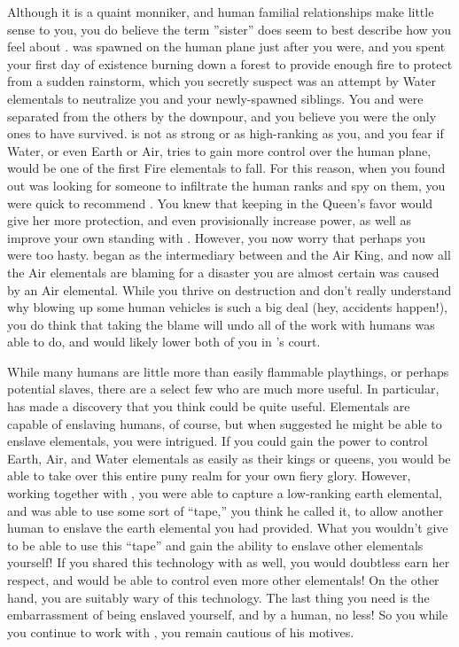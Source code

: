 \documentclass[char]{elementals}
\begin{document}
Although it is a quaint monniker, and human familial relationships make little sense to you, you do believe the term ''sister'' does seem to best describe how you feel about \cJuliet{}.  \cJuliet{\they} was spawned on the human plane just after you were, and you spent your first day of existence burning down a forest to provide enough fire to protect \cJuliet{\them} from a sudden rainstorm, which you secretly suspect was an attempt by Water elementals to neutralize you and your newly-spawned siblings.  You and \cJuliet{} were separated from the others by the downpour, and you believe you were the only ones to have survived. \cJuliet{\they} is not as strong or as high-ranking as you, and you fear if Water, or even Earth or Air, tries to gain more control over the human plane, \cJuliet{\they} would be one of the first Fire elementals to fall. For this reason, when you found out \cQueen{} was looking for someone to infiltrate the human ranks and spy on them, you were quick to recommend \cJuliet{}.  You knew that keeping \cJuliet{\them} in the Queen's favor would give her more protection, and even provisionally increase  power, as well as improve your own standing with \cQueen{}.  However, you now worry that perhaps you were too hasty.  \cJuliet{} began as the intermediary between \cQueen{} and the Air King, and now all the Air elementals are blaming \cJuliet{\them} for a disaster you are almost certain was caused by an Air elemental.  While you thrive on destruction and don't really understand why blowing up some human vehicles is such a big deal (hey, accidents happen!), you do think that \cJuliet{} taking the blame will undo all of the work with humans \cJuliet{\they} was able to do, and would likely lower both of you in \cQueen{}'s court.

While many humans are little more than easily flammable playthings, or perhaps potential slaves, there are a select few who are much more useful.  In particular, \cMS{\intro} has made a discovery that you think could be quite useful.  Elementals are capable of enslaving humans, of course, but when \cMS{} suggested he might be able to enslave elementals, you were intrigued.  If you could gain the power to control Earth, Air, and Water elementals as easily as their kings or queens, you would be able to take over this entire puny realm for your own fiery glory.  However, working together with \cMS{}, you were able to capture a low-ranking earth elemental, and \cMS{} was able to use some sort of ``tape,'' you think he called it, to allow another human to enslave the earth elemental you had provided.  What you wouldn't give to be able to use this ``tape'' and gain the ability to enslave other elementals yourself!  If you shared this technology with \cQueen{} as well, you would doubtless earn her respect, and  would be able to control even more other elementals!  On the other hand, you are suitably wary of this technology.  The last thing you need is the embarrassment of being enslaved yourself, and by a human, no less!  So you while you continue to work with \cMS{}, you remain cautious of his motives.
\end{document}
